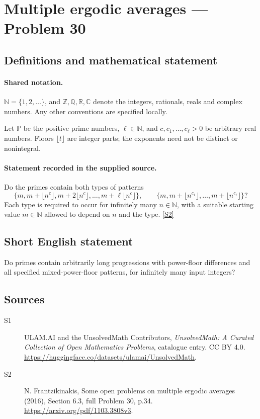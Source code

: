 \documentclass[11pt]{article}
\newcommand{\sref}[2]{\hyperlink{source:#1:#2}{[S#2]}}
\begin{document}
\section{Multiple ergodic averages — Problem 30}\label{statement}

\subsection{Definitions and mathematical statement}

\paragraph{Shared notation.}$\mathbb N=\{1,2,\ldots\}$, and $\mathbb Z,\mathbb Q,\mathbb R,\mathbb C$ denote the integers, rationals, reals and complex numbers. Any other conventions are specified locally.


Let $\mathbb P$ be the positive prime numbers, $\ell\in\mathbb N$, and $c,c_1,\ldots,c_\ell>0$ be arbitrary real numbers. Floors $\lfloor t\rfloor$ are integer parts; the exponents need not be distinct or nonintegral.
\paragraph{Statement recorded in the supplied source.}
Do the primes contain both types of patterns \[\{m,m+\lfloor n^c\rfloor,m+2\lfloor n^c\rfloor,\ldots,m+\ell\lfloor n^c\rfloor\},\qquad \{m,m+\lfloor n^{c_1}\rfloor,\ldots,m+\lfloor n^{c_\ell}\rfloor\}?\] Each type is required to occur for infinitely many $n\in\mathbb N$, with a suitable starting value $m\in\mathbb N$ allowed to depend on $n$ and the type. \sref{statement}{2}
\subsection{Short English statement}
Do primes contain arbitrarily long progressions with power-floor differences and all specified mixed-power-floor patterns, for infinitely many input integers?
\subsection{Sources}
\begin{description}
\item[\hypertarget{source:statement:1}{S1}] ULAM.AI and the UnsolvedMath Contributors, \emph{UnsolvedMath: A Curated Collection of Open Mathematics Problems}, catalogue entry. CC BY 4.0. \url{https://huggingface.co/datasets/ulamai/UnsolvedMath}.
\item[\hypertarget{source:statement:2}{S2}] N. Frantzikinakis, Some open problems on multiple ergodic averages (2016), Section 6.3, full Problem 30, p.34. \url{https://arxiv.org/pdf/1103.3808v3}.
\end{description}
\label{end:statement}
\end{document}
